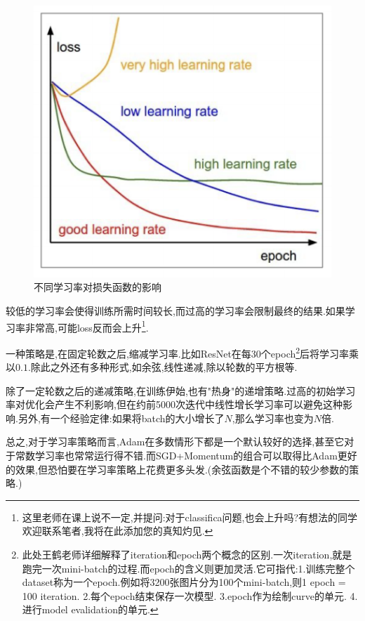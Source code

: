 \begin{figure}[htbp]
	\centering
	\includegraphics[scale=0.65]{figures/learning_rate_schedule.png}
	\caption{不同学习率对损失函数的影响}
	\label{}
\end{figure}

较低的学习率会使得训练所需时间较长,而过高的学习率会限制最终的结果.如果学习率非常高,可能loss反而会上升\footnote{这里老师在课上说不一定,并提问:对于classifica问题,也会上升吗?有想法的同学欢迎联系笔者,我将在此添加您的真知灼见.}.

一种策略是,在固定轮数之后,缩减学习率.比如ResNet在每30个epoch\footnote{此处王鹤老师详细解释了iteration和epoch两个概念的区别.一次iteration,就是跑完一次mini-batch的过程.而epoch的含义则更加灵活.它可指代:1.训练完整个dataset称为一个epoch.例如将3200张图片分为100个mini-batch,则1 epoch = 100 iteration.  2.每个epoch结束保存一次模型.  3.epoch作为绘制curve的单元.  4.进行model evalidation的单元.}后将学习率乘以$0.1$.除此之外还有多种形式,如余弦,线性递减,除以轮数的平方根等.

除了一定轮数之后的递减策略,在训练伊始,也有"热身"的递增策略.过高的初始学习率对优化会产生不利影响,但在约前5000次迭代中线性增长学习率可以避免这种影响.另外,有一个经验定律:如果将batch的大小增长了$N$,那么学习率也变为$N$倍.

总之,对于学习率策略而言,Adam在多数情形下都是一个默认较好的选择,甚至它对于常数学习率也常常运行得不错.而SGD+Momentum的组合可以取得比Adam更好的效果,但恐怕要在学习率策略上花费更多头发.(余弦函数是个不错的较少参数的策略.)